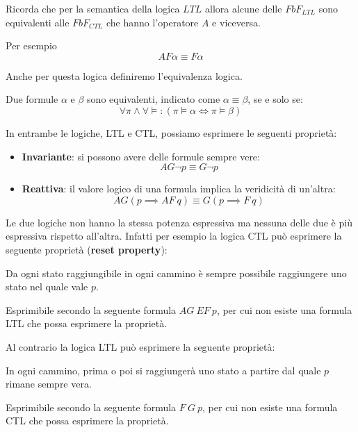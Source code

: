 \begin{nota}
    Ricorda che per la semantica della logica $LTL$ allora alcune delle $FbF_{LTL}$
    sono equivalenti alle $FbF_{CTL}$ che hanno l'operatore $A$ e viceversa.

    Per esempio
    \begin{equation}
        AF\alpha \equiv F\alpha
    \end{equation}
\end{nota}
Anche per questa logica definiremo l'equivalenza logica.
\begin{definizione}
    Due formule $\alpha$ e $\beta$ sono equivalenti, indicato come $\alpha \equiv
        \beta$, se e solo se:
    \begin{equation}
        \forall \pi \land \forall \models : (\pi \models \alpha \iff \pi \models
        \beta)
    \end{equation}
\end{definizione}
In entrambe le logiche, LTL e CTL, possiamo esprimere le seguenti proprietà:
\begin{itemize}
    \item \textbf{Invariante}: si possono avere delle formule sempre vere:
          \begin{equation}
              AG\lnot p \equiv G\lnot p
          \end{equation}
    \item \textbf{Reattiva}: il valore logico di una formula implica la veridicità
          di un'altra:
          \begin{equation}
              AG (p\implies AF \ q) \equiv G(p\implies F \ q)
          \end{equation}
\end{itemize}
Le due logiche non hanno la stessa potenza espressiva ma nessuna delle due è più
espressiva rispetto all'altra. Infatti per esempio la logica CTL può esprimere
la seguente proprietà (\textbf{reset property}):
\begin{center}
    Da ogni stato raggiungibile in ogni cammino è sempre possibile raggiungere
    uno stato nel quale vale $p$.
\end{center}
Esprimibile secondo la seguente formula $AG \ EF \ p$, per cui non esiste una formula
LTL che possa esprimere la proprietà.

Al contrario la logica LTL può esprimere la seguente proprietà:
\begin{center}
    In ogni cammino, prima o poi si raggiungerà uno stato a partire dal quale $p$
    rimane sempre vera.
\end{center}
Esprimibile secondo la seguente formula $F \ G \ p$, per cui non esiste una formula
CTL che possa esprimere la proprietà.

